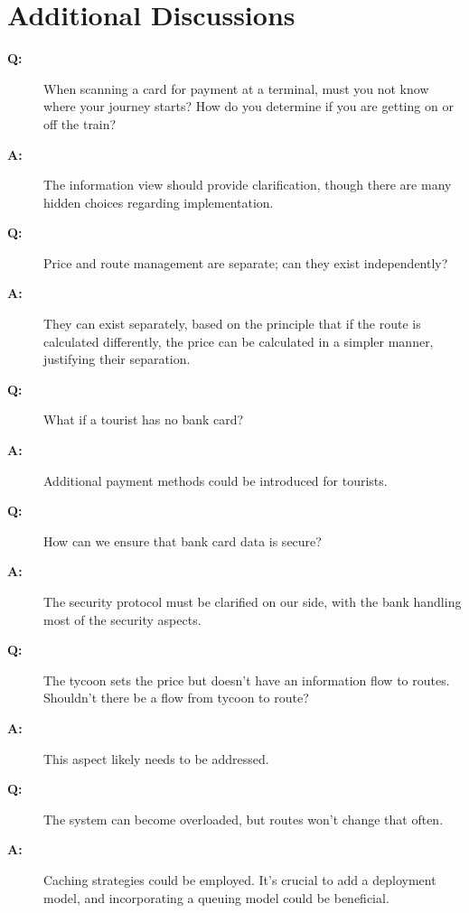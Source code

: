 \documentclass{article}
\begin{document}
\section{Additional Discussions}
\begin{description}
  \item[\textbf{Q:}] When scanning a card for payment at a terminal, must you not know where your journey starts? How do you determine if you are getting on or off the train?
  \item[\textbf{A:}] The information view should provide clarification, though there are many hidden choices regarding implementation.
  
  \item[\textbf{Q:}] Price and route management are separate; can they exist independently?
  \item[\textbf{A:}] They can exist separately, based on the principle that if the route is calculated differently, the price can be calculated in a simpler manner, justifying their separation.
  
  \item[\textbf{Q:}] What if a tourist has no bank card?
  \item[\textbf{A:}] Additional payment methods could be introduced for tourists.
  
  \item[\textbf{Q:}] How can we ensure that bank card data is secure?
  \item[\textbf{A:}] The security protocol must be clarified on our side, with the bank handling most of the security aspects.
  
  \item[\textbf{Q:}] The tycoon sets the price but doesn't have an information flow to routes. Shouldn't there be a flow from tycoon to route?
  \item[\textbf{A:}] This aspect likely needs to be addressed.
  
  \item[\textbf{Q:}] The system can become overloaded, but routes won't change that often.
  \item[\textbf{A:}] Caching strategies could be employed. It's crucial to add a deployment model, and incorporating a queuing model could be beneficial.
\end{description}
\end{document}
